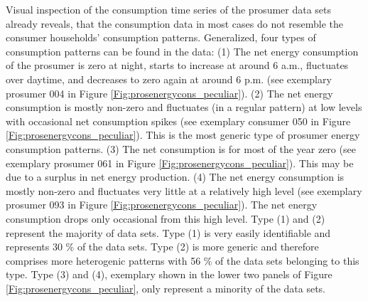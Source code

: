 Visual inspection of the consumption time series of the prosumer data sets already reveals, that the consumption data in most cases do not resemble the consumer households' consumption patterns. Generalized, four types of consumption patterns can be found in the data: (1) The net energy consumption of the prosumer is zero at night, starts to increase at around 6 a.m., fluctuates over daytime, and decreases to zero again at around 6 p.m. (see exemplary prosumer 004 in Figure \ref{Fig:prosenergycons_peculiar}). (2) The net energy consumption is mostly non-zero and fluctuates (in a regular pattern) at low levels with occasional net consumption spikes (see exemplary consumer 050 in Figure \ref{Fig:prosenergycons_peculiar}). This is the most generic type of prosumer energy consumption patterns. (3) The net consumption is for most of the year zero (see exemplary prosumer 061 in Figure \ref{Fig:prosenergycons_peculiar}). This may be due to a surplus in net energy production. (4) The net energy consumption is mostly non-zero and fluctuates very little at a relatively high level (see exemplary prosumer 093 in Figure \ref{Fig:prosenergycons_peculiar}). The net energy consumption drops only occasional from this high level. Type (1) and (2) represent the majority of data sets. Type (1) is very easily identifiable and represents 30 \% of the data sets. Type (2) is more generic and therefore comprises more heterogenic patterns with 56 \% of the data sets belonging to this type. Type (3) and (4), exemplary shown in the lower two panels of Figure \ref{Fig:prosenergycons_peculiar}, only represent a minority of the data sets.

